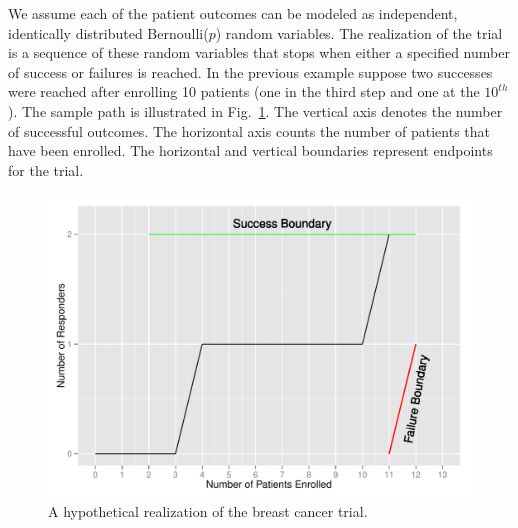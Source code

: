 \documentclass[12pt]{article}         %
\begin{document}
We assume each of the patient outcomes can be modeled as independent, 
identically distributed Bernoulli($p$) random variables. The realization of 
the trial is a sequence of these random variables that stops when either a 
specified number of success or failures is reached. In the 
previous example suppose two successes were reached after enrolling 10 
patients (one in the third step and one at the $10^{th}$). The sample
path is illustrated 
in Fig.~\ref{fig:kane_viz}. The vertical axis denotes the number of 
successful outcomes. The horizontal axis counts the number of patients that 
have been enrolled. The horizontal and vertical boundaries represent 
endpoints for the trial. 

\begin{figure}[t!]
\includegraphics[width=\textwidth]{KanePlot.pdf}
\caption{
A hypothetical realization of the breast cancer trial.
}
\label{fig:kane_viz}
\end{figure}

\end{document}

